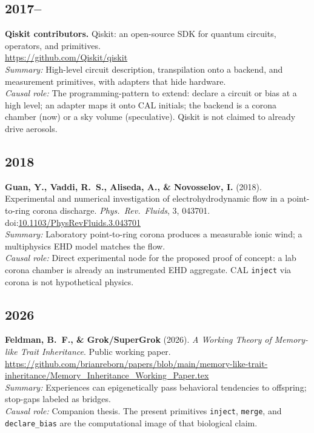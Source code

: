 \documentclass[11pt,a4paper]{article}
\providecommand{\doi}{doi}
\begin{document}
\subsection*{2017--}
\textbf{Qiskit contributors.} Qiskit: an open-source SDK for quantum circuits, operators, and primitives.  \\
\url{https://github.com/Qiskit/qiskit}\\
\textit{Summary:} High-level circuit description, transpilation onto a backend, and measurement primitives, with adapters that hide hardware.\\
\textit{Causal role:} The programming-pattern to extend: declare a circuit or bias at a high level; an adapter maps it onto CAL initials; the backend is a corona chamber (now) or a sky volume (speculative). Qiskit is not claimed to already drive aerosols.

\subsection*{2018}
\textbf{Guan, Y., Vaddi, R.~S., Aliseda, A., \& Novosselov, I.} (2018). Experimental and numerical investigation of electrohydrodynamic flow in a point-to-ring corona discharge. \textit{Phys.\ Rev.\ Fluids}, 3, 043701.  \\
\doi:\url{10.1103/PhysRevFluids.3.043701}\\
\textit{Summary:} Laboratory point-to-ring corona produces a measurable ionic wind; a multiphysics EHD model matches the flow.\\
\textit{Causal role:} Direct experimental node for the proposed proof of concept: a lab corona chamber is already an instrumented EHD aggregate. CAL \texttt{inject} via corona is not hypothetical physics.

\subsection*{2026}
\textbf{Feldman, B.~F., \& Grok/SuperGrok} (2026). \textit{A Working Theory of Memory-like Trait Inheritance}. Public working paper.  \\
\url{https://github.com/brianreborn/papers/blob/main/memory-like-trait-inheritance/Memory_Inheritance_Working_Paper.tex}\\
\textit{Summary:} Experiences can epigenetically pass behavioral tendencies to offspring; stop-gaps labeled as bridges.\\
\textit{Causal role:} Companion thesis. The present primitives \texttt{inject}, \texttt{merge}, and \texttt{declare\_bias} are the computational image of that biological claim.
\end{document}

